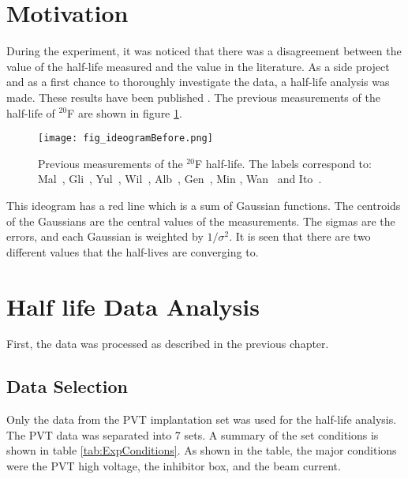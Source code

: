 \documentclass[MaxHughesThesis.tex]{subfiles}
\begin{document}
\section{Motivation}
During the experiment, it was noticed that there was a disagreement between the value of the half-life measured and the value in the literature.
As a side project and as a first chance to thoroughly investigate the data, a half-life analysis was made. 
These results have been published \cite{Hug18}. %
The previous measurements of the half-life of $^{20}$F are shown in figure \ref{fig:IDBefore}.

\begin{figure}[!htb]
	\centerline{\texttt{[image: fig\_ideogramBefore.png]}}
	\caption{Previous measurements of  the $^{20}$F half-life.
		 The labels correspond to: Mal~\cite{Mal62}, Gli~\cite{Gli63},
		Yul~\cite{Yul67}, Wil~\cite{Wil70}, Alb~\cite{Alb75}, Gen~\cite{Gen76},
		Min \cite{Min87}, Wan~\cite{Wan92} and Ito~\cite{Ito95}.}
	\label{fig:IDBefore}
\end{figure}

This ideogram has a red line which is a sum of Gaussian functions.
The centroids of the Gaussians are the central values of the measurements.
The sigmas are the errors, and each Gaussian is weighted by $1/\sigma^{2}$.
It is seen that there are two different values that the half-lives are converging to.


\section{Half life Data Analysis}
\label{sec:analysis}
First, the data was processed as described in the previous chapter.

\subsection{Data Selection}
Only the data from the PVT implantation set was used for the half-life analysis.
The PVT data was separated into 7 sets.
A summary of the set conditions is shown in table \ref{tab:ExpConditions}.
As shown in the table, the major conditions were the PVT high voltage, the inhibitor box, and the beam current. 
\end{document}
